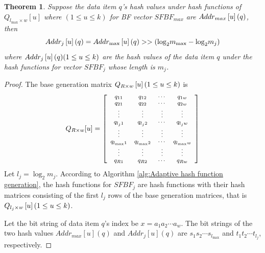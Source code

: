 \documentclass[10pt,journal,letterpaper]{IEEEtran}
\begin{document}
\newtheorem{theorem}{\textbf{Theorem}}
\begin{theorem}
\label{th:hash address}
Suppose the data item $q$'s hash values under hash functions of ${Q_{{l_{\max }} \times w}}[u]$ where $(1 \le u \le k)$ for BF vector $SFBF_{max}$ are $Add{r_{max}}\left[ u \right]{\rm{ }}(q)$, then
\begin{equation}
\small
Add{r_j}\left[ u \right](q) = Add{r_{\max }}\left[ u \right](q) >  > ({\log _2}{m_{\max }} - {\log _2}{m_j})
\label{eq:false whole}
\end{equation}
where $Add{r_j}\left[ u \right](q){\rm{ }}({\rm{1}} \le u \le k)$ are the hash values of the data item $q$ under the hash functions for vector $SFBF_j$ whose length is $m_j$.
\end{theorem}
\begin{proof}
The base generation matrix ${Q_{R \times w}}\left[ u \right]{\rm{ }}({\rm{1}} \le u \le k)$ is
\begin{equation}
\scriptsize
{Q_{R \times w}}[u] = \left[ {\begin{array}{*{20}{c}}
   {{q_{11}}} & {{q_{12}}} &  \cdots  & {{q_{1w}}}  \\
   {{q_{21}}} & {{q_{22}}} &  \cdots  & {{q_{2w}}}  \\
    \vdots  &  \vdots  &  \vdots  &  \vdots   \\
   {{q_{{l_j}1}}} & {{q_{{l_j}2}}} &  \cdots  & {{q_{{l_j}w}}}  \\
    \vdots  &  \vdots  &  \vdots  &  \vdots   \\
   {{q_{{l_{\max }}1}}} & {{q_{{l_{\max }}2}}} &  \cdots  & {{q_{{l_{\max }}w}}}  \\
    \vdots  &  \vdots  &  \vdots  &  \vdots   \\
   {{q_{R1}}} & {{q_{R2}}} &  \cdots  & {{q_{Rw}}}  \\
\end{array}} \right]
\end{equation}
Let ${l_j} = {\log _2}{m_j}$. According to Algorithm \ref{alg:Adaptive hash function generation}, the hash functions for $SFBF_j$ are hash functions with their hash matrices consisting of the first $l_j$ rows of the base generation matrices, that is ${Q_{{l_j} \times w}}\left[ u \right]{\rm{ }}({\rm{1}} \le u \le k)$.

Let the bit string of data item $q$'s index be $x = {a_1}{a_2} \cdots {a_w}$. The bit strings of the two hash values $Add{r_{max}\left[ u \right] (q)}$ and $Add{r_{j}\left[ u \right] (q)}$ are  ${s_1}{s_2} \cdots s_{l_{\max }}$ and ${t_1}{t_2} \cdots t_{l_j}$, respectively.



\end{proof}
\end{document}
